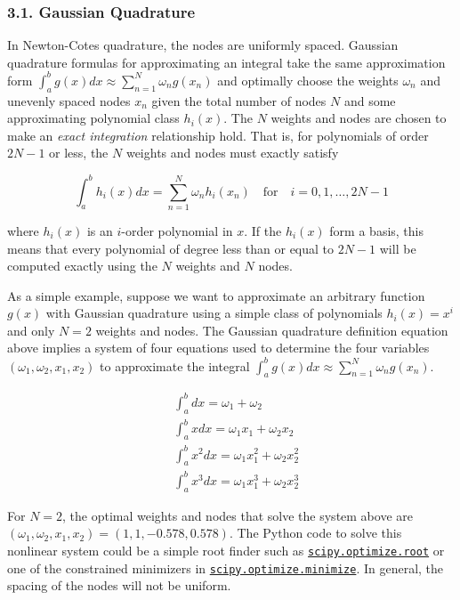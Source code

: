 \documentclass[11pt]{article}
\begin{document}
    \subsubsection{3.1. Gaussian Quadrature}\label{gaussian-quadrature}

In Newton-Cotes quadrature, the nodes are uniformly spaced. Gaussian
quadrature formulas for approximating an integral take the same
approximation form
\(\int_a^b g(x)dx \approx \sum_{n=1}^N\omega_n g(x_n)\) and optimally
choose the weights \(\omega_n\) and unevenly spaced nodes \(x_n\) given
the total number of nodes \(N\) and some approximating polynomial class
\(h_i(x)\). The \(N\) weights and nodes are chosen to make an
\emph{exact integration} relationship hold. That is, for polynomials of
order \(2N-1\) or less, the \(N\) weights and nodes must exactly satisfy

\begin{equation}\label{NumInt_EqGausQuadGen}
  \int_a^b h_i(x)dx = \sum_{n=1}^N \omega_n h_i(x_n) \quad\text{for}\quad i=0,1,\ldots,2N-1
\end{equation}

where \(h_i(x)\) is an \(i\)-order polynomial in \(x\). If the
\(h_i(x)\) form a basis, this means that every polynomial of degree less
than or equal to \(2N-1\) will be computed exactly using the \(N\)
weights and \(N\) nodes.

As a simple example, suppose we want to approximate an arbitrary
function \(g(x)\) with Gaussian quadrature using a simple class of
polynomials \(h_i(x) = x^{i}\) and only \(N=2\) weights and nodes. The
Gaussian quadrature definition equation above implies a system of four
equations used to determine the four variables
\((\omega_1,\omega_2,x_1,x_2)\) to approximate the integral
\(\int_a^b g(x)dx \approx \sum_{n=1}^N\omega_n g(x_n)\).

\begin{equation}\label{NumInt_EqGausQuadN2}
  \begin{split}
    &\int_a^b dx = \omega_1 + \omega_2 \\
    &\int_a^b x dx = \omega_1 x_1 + \omega_2 x_2 \\
    &\int_a^b x^2 dx = \omega_1 x_1^2 + \omega_2 x_2^2 \\
    &\int_a^b x^3 dx = \omega_1 x_1^3 + \omega_2 x_2^3
  \end{split}
\end{equation}

For \(N=2\), the optimal weights and nodes that solve the system above
are \((\omega_1,\omega_2,x_1,x_2)=(1,1,-0.578,0.578)\). The Python code
to solve this nonlinear system could be a simple root finder such as
\href{http://docs.scipy.org/doc/scipy/reference/generated/scipy.optimize.root.html\#scipy.optimize.root}{\texttt{scipy.optimize.root}}
or one of the constrained minimizers in
\href{http://docs.scipy.org/doc/scipy/reference/generated/scipy.optimize.minimize.html\#scipy.optimize.minimize}{\texttt{scipy.optimize.minimize}}.
In general, the spacing of the nodes will not be uniform.
\end{document}
